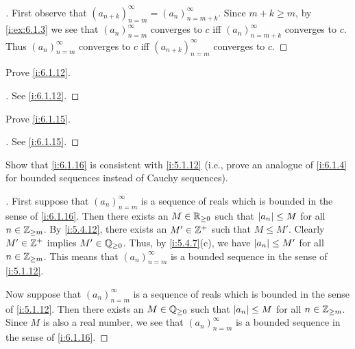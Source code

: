 \begin{proof}[]
  First observe that \((a_{n + k})_{n = m}^\infty = (a_n)_{n = m + k}^\infty\).
  Since \(m + k \geq m\), by \cref{i:ex:6.1.3} we see that \((a_n)_{n = m}^\infty\) converges to \(c\) iff \((a_n)_{n = m + k}^\infty\) converges to \(c\).
  Thus \((a_n)_{n = m}^\infty\) converges to \(c\) iff \((a_{n + k})_{n = m}^\infty\) converges to \(c\).
\end{proof}

\begin{ex}\label{i:ex:6.1.5}
  Prove \cref{i:6.1.12}.
\end{ex}

\begin{proof}[]
  See \cref{i:6.1.12}.
\end{proof}

\begin{ex}\label{i:ex:6.1.6}
  Prove \cref{i:6.1.15}.
\end{ex}

\begin{proof}[]
  See \cref{i:6.1.15}.
\end{proof}

\begin{ex}\label{i:ex:6.1.7}
  Show that \cref{i:6.1.16} is consistent with \cref{i:5.1.12}
  (i.e., prove an analogue of \cref{i:6.1.4} for bounded sequences instead of Cauchy sequences).
\end{ex}

\begin{proof}[]
  First suppose that \((a_n)_{n = m}^\infty\) is a sequence of reals which is bounded in the sense of \cref{i:6.1.16}.
  Then there exists an \(M \in \mathbb{R}_{\geq 0}\) such that \(\left\lvert a_n\right\rvert \leq M\) for all \(n \in \mathbb{Z}_{\geq m}\).
  By \cref{i:5.4.12}, there exists an \(M' \in \mathbb{Z}^+\) such that \(M \leq M'\).
  Clearly \(M' \in \mathbb{Z}^+\) implies \(M' \in \mathbb{Q}_{\geq 0}\).
  Thus, by \cref{i:5.4.7}(c), we have \(\left\lvert a_n\right\rvert \leq M'\) for all \(n \in \mathbb{Z}_{\geq m}\).
  This means that \((a_n)_{n = m}^\infty\) is a bounded sequence in the sense of \cref{i:5.1.12}.

  Now suppose that \((a_n)_{n = m}^\infty\) is a sequence of reals which is bounded in the sense of \cref{i:5.1.12}.
  Then there exists an \(M \in \mathbb{Q}_{\geq 0}\) such that \(\left\lvert a_n\right\rvert \leq M\) for all \(n \in \mathbb{Z}_{\geq m}\).
  Since \(M\) is also a real number, we see that \((a_n)_{n = m}^\infty\) is a bounded sequence in the sense of \cref{i:6.1.16}.
\end{proof}

